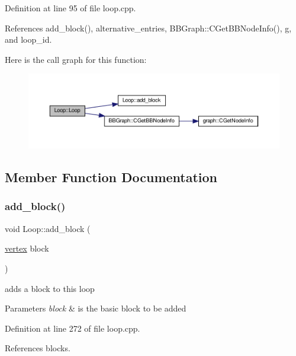 Definition at line 95 of file loop.\+cpp.



References add\+\_\+block(), alternative\+\_\+entries, B\+B\+Graph\+::\+C\+Get\+B\+B\+Node\+Info(), g, and loop\+\_\+id.

Here is the call graph for this function\+:
\nopagebreak
\begin{figure}[H]
\begin{center}
\leavevmode
\includegraphics[width=350pt]{de/d77/classLoop_aacf201b132d323e84f3035aaaf7a5662_cgraph}
\end{center}
\end{figure}


\subsection{Member Function Documentation}
\mbox{\label{classLoop_adc20c1c81f5707afaefe4a02e2b186eb}} 
\subsubsection{\texorpdfstring{add\+\_\+block()}{add\_block()}}
{\footnotesize\ttfamily void Loop\+::add\+\_\+block (\begin{DoxyParamCaption}\item[{\hyperlink{graph_8hpp_abefdcf0544e601805af44eca032cca14}{vertex}}]{block }\end{DoxyParamCaption})}



adds a block to this loop 


\begin{DoxyParams}{Parameters}
{\em block} & is the basic block to be added \\
\hline
\end{DoxyParams}


Definition at line 272 of file loop.\+cpp.



References blocks.



